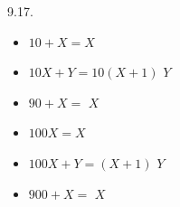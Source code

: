 \begin{refsection}
\begin{practiceproblemsolution}{9.17. \langnameMansi}
\begin{multicols}{2}
    \begin{itemize}

        \item[] $10 + X = X$
        \item[] $10X + Y = 10(X+1)$  $Y$
        \item[] $90 + X =$  $X$
        \item[] $100X = X$
        \item[] $100X + Y = (X+1)$ $Y$
        \item[] $900 + X =$  $X$
    \end{itemize}
\end{multicols}
\end{practiceproblemsolution}


\nocite{Chrisomalis2010, Hurford2011, Ifrah2000, Zaslavsky1999}
\FurtherReadingBox{}
\end{refsection}

